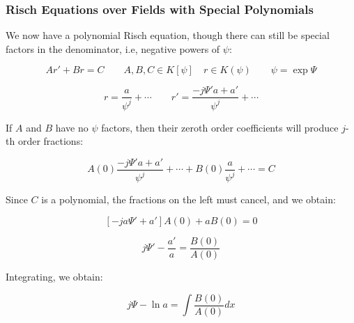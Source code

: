 \documentclass[aspectratio=169,dvipsnames]{beamer}
\begin{document}
\begin{frame}[fragile]
\frametitle{Risch Equations over Fields with Special Polynomials}
\tiny
We now have a polynomial Risch equation, though there can still be
special factors in the denominator, i.e, negative powers of $\psi$:

\begin{equation}
\label{eq: special polynomial Risch}
A r' + B r = C \qquad A,B,C \in K[\psi] \quad r \in K(\psi) \qquad \psi = \exp \Psi
\end{equation}

$$r = \frac{a}{\psi^j} + \cdots  \qquad  r' = \frac{-j \Psi' a + a'}{\psi^{j}} + \cdots$$

If $A$ and $B$ have no $\psi$ factors, then their zeroth order coefficients will produce $j$-th order fractions:

$$ A(0) \frac{-j \Psi' a + a'}{\psi^{j}} + \cdots
+ B(0) \frac{a}{\psi^j} + \cdots  = C$$

Since $C$ is a polynomial, the fractions on the left must cancel, and we obtain:

$$\left[ -ja \Psi' + a' \right] A(0) + a B(0) = 0$$

\begin{equation}
\label{special risch equation - denominator bound unintegrated}
j\Psi' - \frac{a'}{a }  = \frac{B(0)}{A(0)}
\end{equation}

Integrating, we obtain:

\begin{equation}
\label{special risch equation - denominator bound}
j \Psi - \ln a = \int \frac{B(0)}{A(0)} dx
\end{equation}

\end{frame}
\end{document}
